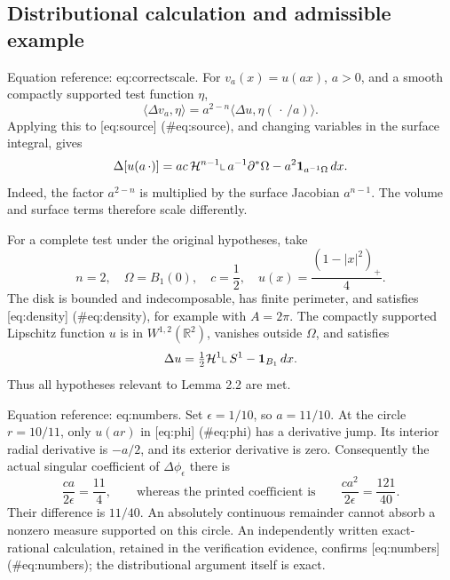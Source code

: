 \documentclass[10pt]{article}
\begin{document}
\subsection*{Distributional calculation and admissible example}
Equation reference: eq:correctscale. For \(v_a(x)=u(ax)\), \(a>0\), and a smooth compactly supported test function \(\eta\), \[\langle\Delta v_a,\eta\rangle
 =a^{2-n}\langle\Delta u,\eta(\,\cdot\,/a)\rangle.\] Applying this to [eq:source] (\#eq:source), and changing variables in the surface integral, gives \[
 \Delta[u(a\,\cdot)]
 =ac\,\mathcal H^{n-1}\!\mathbin{\rule{0.4pt}{1.1ex}\rule{0.7ex}{0.4pt}}a^{-1}\partial^*\Omega
   -a^2\mathbf1_{a^{-1}\Omega}\,dx.\] Indeed, the factor \(a^{2-n}\) is multiplied by the surface Jacobian \(a^{n-1}\). The volume and surface terms therefore scale differently.\par
For a complete test under the original hypotheses, take \[n=2,\quad \Omega=B_1(0),\quad
 c=\frac12,\quad u(x)=\frac{(1-|x|^2)_+}{4}.\] The disk is bounded and indecomposable, has finite perimeter, and satisfies [eq:density] (\#eq:density), for example with \(A=2\pi\). The compactly supported Lipschitz function \(u\) is in \(W^{1,2}(\mathbb R^2)\), vanishes outside \(\Omega\), and satisfies \[\Delta u=\tfrac12\mathcal H^1\!\mathbin{\rule{0.4pt}{1.1ex}\rule{0.7ex}{0.4pt}}S^1-\mathbf1_{B_1}\,dx.\] Thus all hypotheses relevant to Lemma 2.2 are met.\par
Equation reference: eq:numbers. Set \(\epsilon=1/10\), so \(a=11/10\). At the circle \(r=10/11\), only \(u(ar)\) in [eq:phi] (\#eq:phi) has a derivative jump. Its interior radial derivative is \(-a/2\), and its exterior derivative is zero. Consequently the actual singular coefficient of \(\Delta\phi_\epsilon\) there is \[
 \frac{ca}{2\epsilon}=\frac{11}{4},
 \qquad\text{whereas the printed coefficient is}\qquad
 \frac{ca^2}{2\epsilon}=\frac{121}{40}.\] Their difference is \(11/40\). An absolutely continuous remainder cannot absorb a nonzero measure supported on this circle. An independently written exact-rational calculation, retained in the verification evidence, confirms [eq:numbers] (\#eq:numbers); the distributional argument itself is exact.\par
\end{document}
